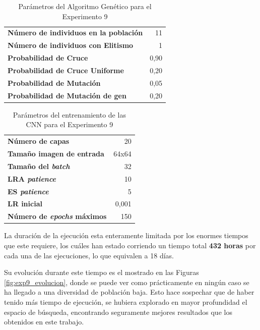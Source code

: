 \begin{table}[!h]
\caption{Parámetros del Algoritmo Genético para el Experimento 9}
\label{tab:exp9_par_ag}
\centering
\begin{tabular}{l|r}
\toprule
\textbf{Número de individuos en la población} & 11   \\
\textbf{Número de individuos con Elitismo}    & 1    \\
\textbf{Probabilidad de Cruce }               & 0,90 \\
\textbf{Probabilidad de Cruce Uniforme }      & 0,20 \\
\textbf{Probabilidad de Mutación}             & 0,05 \\
\textbf{Probabilidad de Mutación de gen}      & 0,20 \\
\bottomrule
\end{tabular}
\end{table}

\vspace*{1.5 cm}

\begin{table}[!h]
\caption{Parámetros del entrenamiento de las CNN para el Experimento 9}
\label{tab:exp9_par_cnn}
\centering
\begin{tabular}{l|r}
\toprule 
\textbf{Número de capas}          & 20    \\
\textbf{Tamaño imagen de entrada} & 64x64 \\
\textbf{Tamaño del \textit{batch}}         & 32    \\
\textbf{LRA \textit{patience}}             & 10    \\
\textbf{ES \textit{patience}}              & 5     \\
\textbf{LR inicial}               & 0,001 \\
\textbf{Número de \textit{epochs} máximos}           & 150  \\
\bottomrule
\end{tabular}
\end{table}

La duración de la ejecución esta enteramente limitada por los enormes tiempos que este requiere, los cuáles han estado corriendo un tiempo total \textbf{432 horas} por cada una de las ejecuciones, lo que equivalen a 18 días. 

Su evolución durante este tiempo es el mostrado en las Figuras \ref{fig:exp9_evolucion}, donde se puede ver como prácticamente en ningún caso se ha llegado a una diversidad de población baja. Esto hace sospechar que de haber tenido más tiempo de ejecución, se hubiera explorado en mayor profundidad el espacio de búsqueda, encontrando seguramente mejores resultados que los obtenidos en este trabajo.

